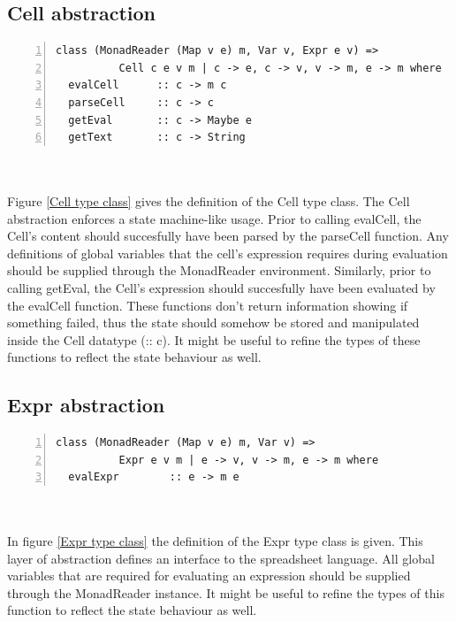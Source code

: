 \documentclass[10pt,a4paper]{article}
\begin{document}
\subsection{Cell abstraction}
\label{Cell abstraction}
\begin{minipage}{\linewidth}
\begin{Verbatim}[numbers=left,stepnumber=1,numbersep=5pt]
class (MonadReader (Map v e) m, Var v, Expr e v) =>
          Cell c e v m | c -> e, c -> v, v -> m, e -> m where
  evalCell      :: c -> m c
  parseCell     :: c -> c
  getEval       :: c -> Maybe e
  getText       :: c -> String
\end{Verbatim}
\label{Cell type class}
\end{minipage}
\\\\
Figure \ref{Cell type class} gives the definition of the Cell type class.
The Cell abstraction enforces a state machine-like usage. Prior to calling evalCell, the Cell's
content should succesfully have been parsed by the parseCell function. Any definitions of
global variables that the cell's expression requires during evaluation should be supplied through
the MonadReader environment. Similarly, prior to calling getEval, the Cell's expression should
succesfully have been evaluated by the evalCell function. These functions don't return information
showing if something failed, thus the state should somehow be stored and manipulated inside the
Cell datatype (:: c). It might be useful to refine the types of these functions to reflect the
state behaviour as well.

\subsection{Expr abstraction}
\label{Expr abstraction}
\begin{minipage}{\linewidth}
\begin{Verbatim}[numbers=left,stepnumber=1,numbersep=5pt]
class (MonadReader (Map v e) m, Var v) =>
          Expr e v m | e -> v, v -> m, e -> m where
  evalExpr        :: e -> m e
\end{Verbatim}
\label{Expr type class}
\end{minipage}
\\\\
In figure \ref{Expr type class} the definition of the Expr type class is given. This layer
of abstraction defines an interface to the spreadsheet language. All global variables that are
required for evaluating an expression should be supplied through the MonadReader instance.
It might be useful to refine the types of this function to reflect the state behaviour as well.
\end{document}
